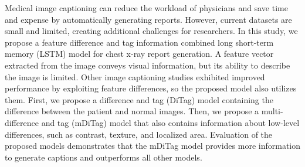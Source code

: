 Medical image captioning can reduce the workload of physicians and save time and expense by automatically generating reports. However, current datasets are small and limited, creating additional challenges for researchers. In this study, we propose a feature difference and tag information combined long short-term memory (LSTM) model for chest x-ray report generation. A feature vector extracted from the image conveys visual information, but its ability to describe the image is limited. Other image captioning studies exhibited improved performance by exploiting feature differences, so the proposed model also utilizes them. First, we propose a difference and tag (DiTag) model containing the difference between the patient and normal images. Then, we propose a multi-difference and tag (mDiTag) model that also contains information about low-level differences, such as contrast, texture, and localized area. Evaluation of the proposed models demonstrates that the mDiTag model provides more information to generate captions and outperforms all other models.
